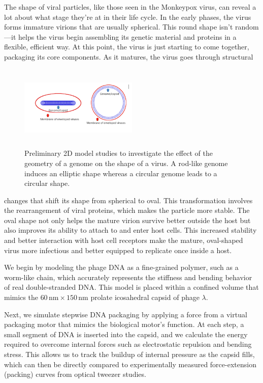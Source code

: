 \documentclass[12pt]{article}
\begin{document}
\begin{flushleft}
The shape of viral particles, like those seen in the Monkeypox virus, can reveal a lot about what stage they’re at in their life cycle. In the early phases, the virus forms immature virions that are usually spherical. This round shape isn’t random—it helps the virus begin assembling its genetic material and proteins in a flexible, efficient way. At this point, the virus is just starting to come together, packaging its core components. As it matures, the virus goes through structural 

\begin{figure}[!ht]
  \centering
  \includegraphics[width=0.5\textwidth,height=4cm]{monkeypox.png}  %
  \caption{Preliminary 2D model studies to
investigate the effect of the geometry of a
genome on the shape of a virus. A rod-like
genome induces an elliptic shape whereas a
circular genome leads to a circular shape.}
\end{figure}

\noindent changes that shift its shape from spherical to oval. This transformation involves the rearrangement of viral proteins, which makes the particle more stable. The oval shape not only helps the mature virion survive better outside the host but also improves its ability to attach to and enter host cells. This increased stability and better interaction with host cell receptors make the mature, oval-shaped virus more infectious and better equipped to replicate once inside a host.




We begin by modeling the phage DNA as a fine-grained polymer, such as a worm-like chain, which accurately represents the stiffness and bending behavior of real double-stranded DNA. This model is placed within a confined volume that mimics the $60\,\text{nm} \times 150\,\text{nm}$ prolate icosahedral capsid of phage $\lambda$.
 


Next, we simulate stepwise DNA packaging by applying a force from a virtual packaging motor that mimics the biological motor’s function. At each step, a small segment of DNA is inserted into the capsid, and we calculate the energy required to overcome internal forces such as electrostatic repulsion and bending stress. This allows us to track the buildup of internal pressure as the capsid fills, which can then be directly compared to experimentally measured force-extension (packing) curves from optical tweezer studies.


\end{flushleft}
\end{document}
